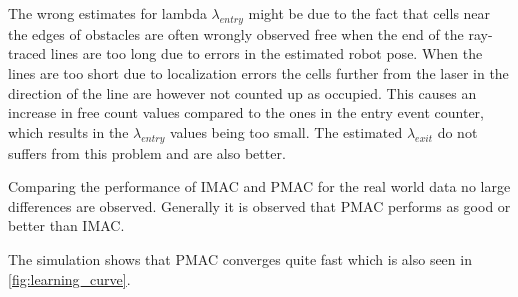 The wrong estimates for lambda $\lambda_{entry}$ might be due to the fact that cells near the edges of obstacles are often wrongly observed free when the end of the ray-traced lines are too long due to errors in the estimated robot pose.
When the lines are too short due to localization errors the cells further from the laser in the direction of the line are however not counted up as occupied.
This causes an increase in free count values compared to the ones in the entry event counter, which results in the $\lambda_{entry}$ values being too small.
The estimated $\lambda_{exit}$ do not suffers from this problem and are also better.

Comparing the performance of IMAC and PMAC for the real world data no large differences are observed. Generally it is observed that PMAC performs as good or better than IMAC.

The simulation shows that PMAC converges quite fast which is also seen in \ref{fig:learning_curve}.
